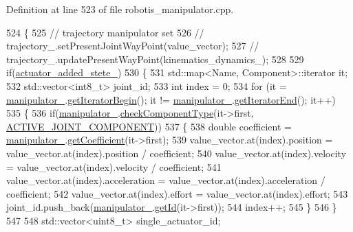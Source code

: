 Definition at line 523 of file robotis\+\_\+manipulator.\+cpp.


\begin{DoxyCode}
524 \{
525   \textcolor{comment}{// trajectory manipulator set}
526   \textcolor{comment}{// trajectory\_.setPresentJointWayPoint(value\_vector);}
527   \textcolor{comment}{// trajectory\_.updatePresentWayPoint(kinematics\_dynamics\_);}
528 
529   \textcolor{keywordflow}{if}(\hyperlink{classrobotis__manipulator_1_1_robotis_manipulator_a02073b7982b992642b28acfa35a17769}{actuator\_added\_stete\_})
530   \{
531     std::map<Name, Component>::iterator it;
532     std::vector<int8\_t> joint\_id;
533     \textcolor{keywordtype}{int} index = 0;
534     \textcolor{keywordflow}{for} (it = \hyperlink{classrobotis__manipulator_1_1_robotis_manipulator_a5b2df4a3b3ee7f408cb1d0eaf61644dc}{manipulator\_}.\hyperlink{classrobotis__manipulator_1_1_manipulator_a83e1adbb8c496ebf785311c8aab2b9ad}{getIteratorBegin}(); it != 
      \hyperlink{classrobotis__manipulator_1_1_robotis_manipulator_a5b2df4a3b3ee7f408cb1d0eaf61644dc}{manipulator\_}.\hyperlink{classrobotis__manipulator_1_1_manipulator_ae600869bf358724f53241eb5f061ea78}{getIteratorEnd}(); it++)
535     \{
536       \textcolor{keywordflow}{if}(\hyperlink{classrobotis__manipulator_1_1_robotis_manipulator_a5b2df4a3b3ee7f408cb1d0eaf61644dc}{manipulator\_}.\hyperlink{classrobotis__manipulator_1_1_manipulator_a5b1f27b9cc2875b4e0275e3b88ab1b28}{checkComponentType}(it->first, 
      \hyperlink{namespacerobotis__manipulator_a2bbf89d1c08dc1d9ff4e28beb939e382acdf3b34914d1a2a028d882beb96fba7c}{ACTIVE\_JOINT\_COMPONENT}))
537       \{
538         \textcolor{keywordtype}{double} coefficient = \hyperlink{classrobotis__manipulator_1_1_robotis_manipulator_a5b2df4a3b3ee7f408cb1d0eaf61644dc}{manipulator\_}.\hyperlink{classrobotis__manipulator_1_1_manipulator_a437ac5f137aa788c4db07690c185e9ba}{getCoefficient}(it->first);
539         value\_vector.at(index).position = value\_vector.at(index).position / coefficient;
540         value\_vector.at(index).velocity = value\_vector.at(index).velocity / coefficient;
541         value\_vector.at(index).acceleration = value\_vector.at(index).acceleration / coefficient;
542         value\_vector.at(index).effort = value\_vector.at(index).effort;
543         joint\_id.push\_back(\hyperlink{classrobotis__manipulator_1_1_robotis_manipulator_a5b2df4a3b3ee7f408cb1d0eaf61644dc}{manipulator\_}.\hyperlink{classrobotis__manipulator_1_1_manipulator_a60db34ef6a62e0b15aa36f9b1571640d}{getId}(it->first));
544         index++;
545       \}
546     \}
547 
548     std::vector<uint8\_t> single\_actuator\_id;

\end{DoxyCode}
